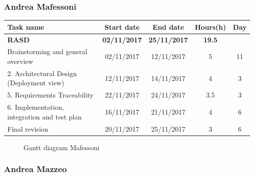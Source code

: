 
\subsubsection{Andrea Mafessoni}

\begin{table}[h!]
	\begin{tabular}{lcccc}
		\toprule
		\textbf{Task name} & \textbf{Start date} & \textbf{End date} & \textbf{Hours(h)} & \textbf{Day} \\
		\midrule
		\textbf{RASD} & \textbf{02/11/2017} & \textbf{25/11/2017} & \textbf{19.5} & \\
		Brainstorming and general overview & 02/11/2017 & 12/11/2017 & 5 & 11 \\
		2. Architectural Design (Deployment view) & 12/11/2017 & 14/11/2017 & 4 & 3 \\
		5. Requirements Traceability & 22/11/2017 & 24/11/2017 & 3.5 & 3 \\
		6. Implementation, integration and test plan & 16/11/2017 & 21/11/2017 & 4 & 6 \\
		\bottomrule
		Final revision & 20/11/2017 & 25/11/2017 & 3 & 6 \\
	\end{tabular}
\end{table}

\begin{figure}[!h]
	\centering
	\caption{Gantt diagram Mafessoni}
\end{figure}
\clearpage

\subsubsection{Andrea Mazzeo}

